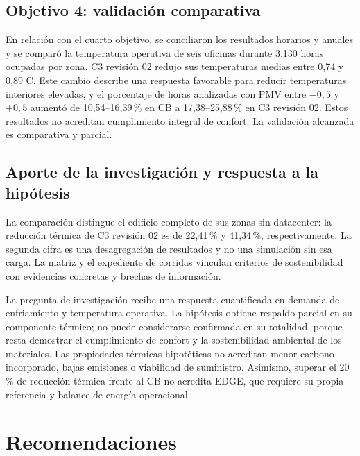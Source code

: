 \subsection{Objetivo 4: validación comparativa}
\begin{textoDosTercios}
En relación con el cuarto objetivo, se conciliaron los resultados horarios y anuales y se comparó la temperatura operativa de seis oficinas durante 3.130 horas ocupadas por zona. C3 revisión 02 redujo sus temperaturas medias entre 0,74 y 0,89 \textdegree C. Este cambio describe una respuesta favorable para reducir temperaturas interiores elevadas, y el porcentaje de horas analizadas con PMV entre $-0,5$ y $+0,5$ aumentó de 10,54--16,39\,\% en CB a 17,38--25,88\,\% en C3 revisión 02. Estos resultados no acreditan cumplimiento integral de confort. La validación alcanzada es comparativa y parcial.

\end{textoDosTercios}
\subsection{Aporte de la investigación y respuesta a la hipótesis}
\begin{textoDosTercios}
La comparación distingue el edificio completo de sus zonas sin datacenter: la reducción térmica de C3 revisión 02 es de 22,41\,\% y 41,34\,\%, respectivamente. La segunda cifra es una desagregación de resultados y no una simulación sin esa carga. La matriz y el expediente de corridas vinculan criterios de sostenibilidad con evidencias concretas y brechas de información.

La pregunta de investigación recibe una respuesta cuantificada en demanda de enfriamiento y temperatura operativa. La hipótesis obtiene respaldo parcial en su componente térmico; no puede considerarse confirmada en su totalidad, porque resta demostrar el cumplimiento de confort y la sostenibilidad ambiental de los materiales. Las propiedades térmicas hipotéticas no acreditan menor carbono incorporado, bajas emisiones o viabilidad de suministro. Asimismo, superar el 20\,\% de reducción térmica frente al CB no acredita EDGE, que requiere su propia referencia y balance de energía operacional.
\end{textoDosTercios}

\par\medskip
\section{Recomendaciones}
